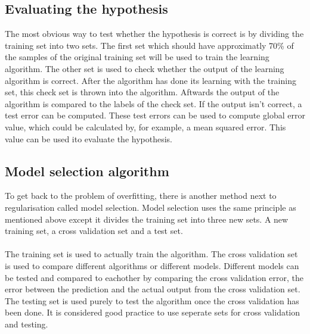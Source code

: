 \subsection{Evaluating the hypothesis}
\label{evaluationHypothesis}
The most obvious way to test whether the hypothesis is correct is by dividing the training set into two sets. The first set which should have approximatly 70\% of the samples of the original training set will be used to train the learning algorithm. The other set is used to check whether the output of the learning algorithm is correct. After the algorithm has done its learning with the training set, this check set is thrown into the algorithm. Aftwards the output of the algorithm is compared to the labels of the check set. If the output isn't correct, a test error can be computed. These test errors can be used to compute global error value, which could be calculated by, for example, a mean squared error. This value can be used ito evaluate the hypothesis. \cite{evalml}

\subsection{Model selection algorithm}
\label{modelselection}
To get back to the problem of overfitting, there is another method next to regularisation called model selection. Model selection uses the same principle as mentioned above except it divides the training set into three new sets. A new training set, a cross validation set and a test set. \\\\
The training set is used to actually train the algorithm. The cross validation set is used to compare different algorithms or different models. Different models can be tested and compared to eachother by comparing the cross validation error, the error between the prediction and the actual output from the cross validation set. The testing set is used purely to test the algorithm once the cross validation has been done. It is considered good practice to use seperate sets for cross validation and testing. \cite{wiki}

